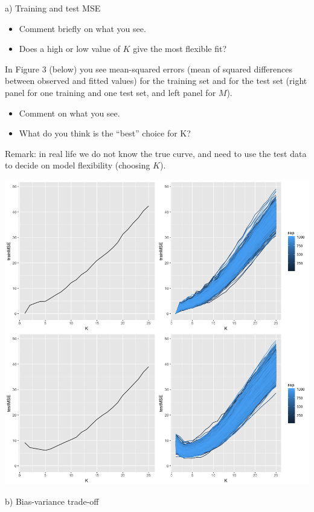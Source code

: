 \documentclass[ignorenonframetext,]{beamer}
\providecommand{\tightlist}{%
  \setlength{\itemsep}{0pt}\setlength{\parskip}{0pt}}
\begin{document}
\begin{frame}
\begin{block}{a) Training and test MSE}
\begin{itemize}
\tightlist
\item
  Comment briefly on what you see.
\item
  Does a high or low value of \(K\) give the most flexible fit?
\end{itemize}

In Figure 3 (below) you see mean-squared errors (mean of squared
differences between observed and fitted values) for the training set and
for the test set (right panel for one training and one test set, and
left panel for \(M\)).

\begin{itemize}
\tightlist
\item
  Comment on what you see.
\item
  What do you think is the ``best'' choice for K?
\end{itemize}

Remark: in real life we do not know the true curve, and need to use the
test data to decide on model flexibility (choosing \(K\)).

\includegraphics{Prob1f3.png}

\end{block}

\begin{block}{b) Bias-variance trade-off}


\end{block}
\end{frame}
\end{document}
